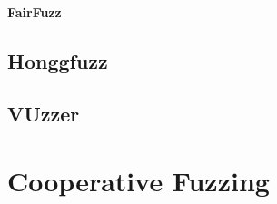 \paragraph{FairFuzz}

\subsection{Honggfuzz}

\subsection{VUzzer}

\section{Cooperative Fuzzing}
\label{sec:coop}



